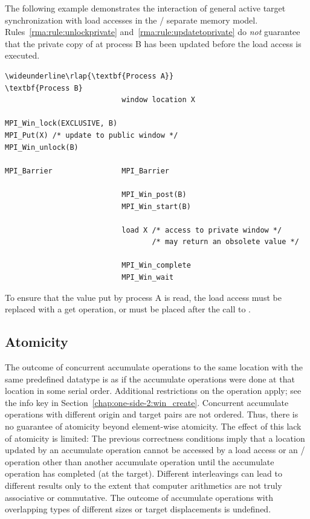 \begin{example}
%
The following example demonstrates the interaction of general
active target synchronization with load accesses in the
\RMA/ separate memory model.  Rules~\ref{rma:rule:unlockprivate}
and~\ref{rma:rule:updatetoprivate} do \emph{not} guarantee that the
private copy of  at process B has been updated before the load access is executed.

\begin{Verbatim}[commandchars=\\\{\}]
\wideunderline\rlap{\textbf{Process A}}                           \textbf{Process B}
                           window location X

MPI_Win_lock(EXCLUSIVE, B)
MPI_Put(X) /* update to public window */
MPI_Win_unlock(B)

MPI_Barrier                MPI_Barrier

                           MPI_Win_post(B)
                           MPI_Win_start(B)

                           load X /* access to private window */
                                  /* may return an obsolete value */

                           MPI_Win_complete
                           MPI_Win_wait
\end{Verbatim}
\lstset{fancyvrb=false}
To ensure that the value put by process A is read, the load access must
be replaced with a get operation, or must be
placed after the call to .
\end{example}

\subsection{Atomicity}
\label{sec:rma-atomicity}

The outcome of concurrent accumulate operations to the
same location with the
same predefined datatype is as if the accumulate operations were done
at that location
in some serial order. Additional restrictions on the
operation apply; see the info key
 in 
Section~\ref{chap:one-side-2:win_create}. 
Concurrent accumulate operations
with different origin and target pairs 
are not ordered. Thus, there is no guarantee of atomicity beyond element-wise atomicity.
The effect of this lack of atomicity is limited:
The previous correctness conditions imply that
a location updated by
an accumulate operation cannot be accessed by a load access or an
\RMA/ operation other than another accumulate operation until the
accumulate operation
has completed (at the target).  Different interleavings can lead
to different results only to the extent that computer arithmetics are
not truly associative or commutative.
The outcome of accumulate operations with overlapping types of different
sizes or target displacements is undefined. 

